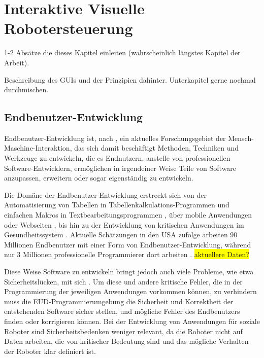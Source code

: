 \chapter{Interaktive Visuelle Robotersteuerung} %
1-2 Absätze die dieses Kapitel einleiten (wahrscheinlich längstes Kapitel der Arbeit).

 Beschreibung des GUIs und der Prinzipien dahinter. Unterkapitel gerne nochmal durchmischen.

\section{Endbenutzer-Entwicklung} %

Endbenutzer-Entwicklung ist, nach \citeauthor{Lieberman2006EUDaEP} \cite{Lieberman2006EUDaEP}, ein aktuelles Forschungsgebiet der Mensch-Maschine-Interaktion, das sich damit beschäftigt Methoden, Techniken und Werkzeuge zu entwickeln, die es Endnutzern, anstelle von professionellen Software-Entwicklern, ermöglichen in irgendeiner Weise Teile von Software anzupassen, erweitern oder sogar eigenständig zu entwickeln.

Die Domäne der Endbenutzer-Entwicklung erstreckt sich von der Automatisierung von Tabellen in Tabellenkalkulations-Programmen und einfachen Makros in Textbearbeitungsprogrammen \cite{Scaffidi2005EstimatingNEUP}, über mobile Anwendungen \cite{Wolber2011AppInventor} oder Webseiten \cite{Rode2005EUDWebDev}, bis hin zu der Entwicklung von kritischen Anwendungen im Gesundheitssystem \cite{Lindgren2010ModelPKSHD}. Aktuelle Schätzungen in den USA zufolge arbeiten 90 Millionen Endbenutzer mit einer Form von Endbenutzer-Entwicklung, während nur 3 Millionen professionelle Programmierer dort arbeiten \cite{Scaffidi2005EstimatingNEUP}. \colorbox{yellow}{aktuellere Daten?}

Diese Weise Software zu entwickeln bringt jedoch auch viele Probleme, wie etwa Sicherheitslücken, mit sich \cite{Harrison2004DangersEUP}. Um diese und andere kritische Fehler, die in der Programmierung der jeweiligen Anwendungen vorkommen können, zu verhindern muss die EUD-Programmierumgebung die Sicherheit und Korrektheit der entstehenden Software sicher stellen, und mögliche Fehler des Endbenutzers finden oder korrigieren können. Bei der Entwicklung von Anwendungen für soziale Roboter sind Sicherheitsbedenken weniger relevant, da die Roboter nicht auf Daten arbeiten, die von kritischer Bedeutung sind und das mögliche Verhalten der Roboter klar definiert ist.

